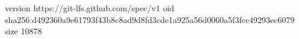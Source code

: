 version https://git-lfs.github.com/spec/v1
oid sha256:d492360a9e61793f43b8c8ad9d8fd3cde1a925a56d0060a5f3fcc49293ec6079
size 10878
